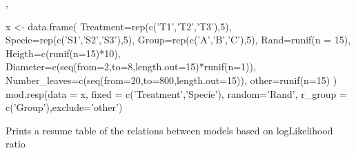 \documentclass[letterpaper]{book}
\begin{document}
%
\begin{References}\relax
{}, 
\end{References}
%
\begin{Examples}
\begin{ExampleCode}

x <- data.frame(
    Treatment=rep(c('T1','T2','T3'),5),
    Specie=rep(c('S1','S2','S3'),5),
    Group=rep(c('A','B','C'),5),
    Rand=runif(n = 15),
    Heigth=c(runif(n=15)*10),
    Diameter=c(seq(from=2,to=8,length.out=15)*runif(n=1)),
    Number_leaves=c(seq(from=20,to=800,length.out=15)),
    other=runif(n=15)
)
mod.resp(data = x, fixed = c('Treatment','Specie'), random='Rand', r_group = c('Group'),exclude='other')

\end{ExampleCode}
\end{Examples}
%
\begin{Description}\relax
Prints a resume table of the relations between models based on logLikelihood ratio
\end{Description}
\printindex{}
\end{document}
